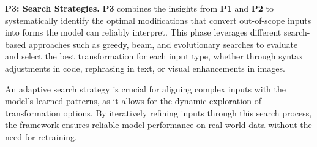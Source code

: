 \textbf{P3: Search Strategies.} \textbf{P3} combines the insights from \textbf{P1} and \textbf{P2} to systematically identify the optimal modifications that convert out-of-scope inputs into forms the model can reliably interpret. This phase leverages different search-based approaches such as greedy, beam, and evolutionary searches to evaluate and select the best transformation for each input type, whether through syntax adjustments in code, rephrasing in text, or visual enhancements in images.

An adaptive search strategy is crucial for aligning complex inputs with the model’s learned patterns, as it allows for the dynamic exploration of transformation options. By iteratively refining inputs through this search process, the framework ensures reliable model performance on real-world data without the need for retraining.
















